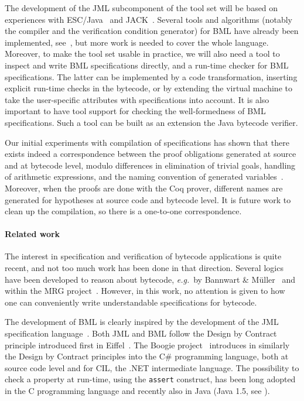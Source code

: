 The development of the JML subcomponent of the tool set will be based
on experiences with ESC/Java~\cite{CokK04} and JACK~\cite{BurdyRL03}.
Several tools and algorithms (notably the compiler and the
verification condition generator) for BML have already been
implemented, see~\cite{BP06JSV,Pavlova:phd}, but more work is needed
to cover the whole language. Moreover, to make the tool set usable in
practice, we will also need a tool to inspect and write BML
specifications directly, and a run-time checker for BML
specifications. The latter can be implemented by a code
transformation, inserting explicit run-time checks in the bytecode, or
by extending the virtual machine to take the user-specific attributes
with specifications into account.  It is also important to have tool
support for checking the well-formedness of BML specifications. Such a
tool can be built as an extension the Java bytecode verifier.

Our initial experiments with compilation of specifications has shown
that there exists indeed a correspondence between the proof
obligations generated at source and at bytecode level, modulo
differences in elimination of trivial goals, handling of arithmetic
expressions, and the naming convention of generated
variables~\cite{Pavlova:phd}. Moreover, when the proofs are done with
the Coq prover, different names are generated for hypotheses at source
code and bytecode level. It is future work to clean up the
compilation, so there is a one-to-one correspondence.




 

\paragraph{Related work}
The interest in specification and verification of bytecode
applications is quite recent, and not too much work has been done in
that direction. Several logics have been developed to reason about
bytecode, \emph{e.g.}~by Bannwart \& M\"uller~\cite{BannwartMueller05}
and within the MRG project~\cite{AspinallEtAl:TPHOLs2004}. However, in
this work, no attention is given to how one can conveniently write
understandable specifications for bytecode.

The development of BML is clearly inspired by the development of the
JML specification language~\cite{JMLReferenceManual05}. Both JML and
BML follow the Design by Contract principle introduced first in
Eiffel~\cite{Meyer97}. The Boogie project~\cite{BarnettCDJL05}
introduces in similarly the Design by Contract principles into the C\#
programming language, both at source code level and for CIL, the .NET
intermediate language.  The possibility to check a property at
run-time, using the \texttt{assert} construct, has been long 
adopted in the C programming language and recently also in Java (Java
1.5, see \cite[\S 14.10]{JLS}). 

